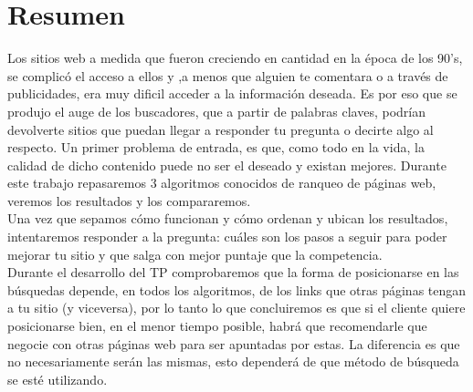 \section{Resumen}

Los sitios web a medida que fueron creciendo en cantidad en la época de los 90's, se complicó el acceso a ellos y ,a menos que alguien te comentara o a través de publicidades, era muy dificil acceder a la información deseada. Es por eso que se produjo el auge de los buscadores, que a partir de palabras claves, podrían devolverte sitios que  puedan llegar a responder tu pregunta o decirte algo al respecto. 
Un primer problema de entrada, es que, como todo en la vida, la calidad de dicho contenido puede no ser el deseado y existan mejores. Durante este trabajo repasaremos 3 algoritmos conocidos de ranqueo de páginas web, veremos los resultados y los compararemos. \\
Una vez que sepamos cómo funcionan y cómo ordenan y ubican los resultados, intentaremos responder a la pregunta: cuáles son los pasos a seguir para poder mejorar tu sitio y que salga con mejor puntaje que la competencia.\\
Durante el desarrollo del TP comprobaremos que la forma de posicionarse en las búsquedas depende, en todos los algoritmos, de los links que otras páginas tengan a tu sitio (y viceversa), por lo tanto lo que concluiremos es que si el cliente quiere posicionarse bien, en el menor tiempo posible, habrá que recomendarle que negocie con otras páginas web para ser apuntadas por estas. La diferencia es que no necesariamente serán las mismas, esto dependerá de que método de búsqueda se esté utilizando.
